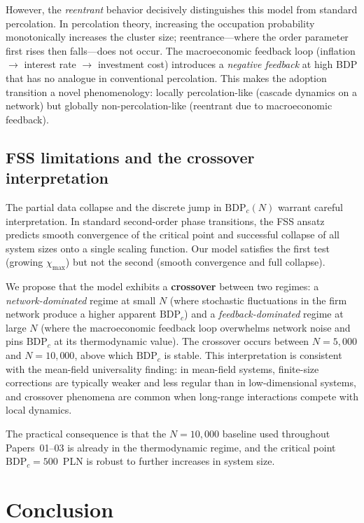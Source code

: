 \documentclass[12pt,a4paper]{article}
\begin{document}
However, the \emph{reentrant} behavior decisively distinguishes this model
from standard percolation. In percolation theory, increasing the occupation
probability monotonically increases the cluster size; reentrance---where the
order parameter first rises then falls---does not occur. The macroeconomic
feedback loop (inflation $\to$ interest rate $\to$ investment cost) introduces
a \emph{negative feedback} at high BDP that has no analogue in conventional
percolation. This makes the adoption transition a novel phenomenology: locally
percolation-like (cascade dynamics on a network) but globally
non-percolation-like (reentrant due to macroeconomic feedback).

\subsection{FSS limitations and the crossover interpretation}

The partial data collapse and the discrete jump in $\mathrm{BDP}_c(N)$ warrant
careful interpretation. In standard second-order phase transitions, the FSS
ansatz predicts smooth convergence of the critical point and successful
collapse of all system sizes onto a single scaling function. Our model satisfies
the first test (growing $\chi_{\max}$) but not the second (smooth convergence
and full collapse).

We propose that the model exhibits a \textbf{crossover} between two regimes:
a \emph{network-dominated} regime at small $N$ (where stochastic fluctuations
in the firm network produce a higher apparent $\mathrm{BDP}_c$) and a
\emph{feedback-dominated} regime at large $N$ (where the macroeconomic
feedback loop overwhelms network noise and pins $\mathrm{BDP}_c$ at its
thermodynamic value). The crossover occurs between $N = 5{,}000$ and
$N = 10{,}000$, above which $\mathrm{BDP}_c$ is stable. This interpretation
is consistent with the mean-field universality finding: in mean-field systems,
finite-size corrections are typically weaker and less regular than in
low-dimensional systems, and crossover phenomena are common when long-range
interactions compete with local dynamics.

The practical consequence is that the $N = 10{,}000$ baseline used throughout
Papers~01--03 is already in the thermodynamic regime, and the critical point
$\mathrm{BDP}_c = 500$~PLN is robust to further increases in system size.

\section{Conclusion}
\label{sec:conclusion}
\end{document}
